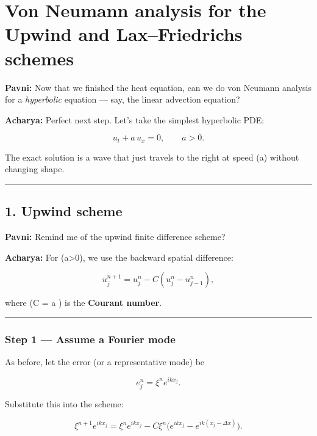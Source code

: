 \documentclass[
  letterpaper,
]{book}
\begin{document}

\chapter{Von Neumann analysis for the Upwind and Lax--Friedrichs
schemes}\label{von-neumann-analysis-for-the-upwind-and-laxfriedrichs-schemes}

\textbf{Pavni:} Now that we finished the heat equation, can we do von
Neumann analysis for a \emph{hyperbolic} equation --- say, the linear
advection equation?

\textbf{Acharya:} Perfect next step. Let's take the simplest hyperbolic
PDE:

\[
u_t + a\,u_x = 0, \qquad a>0.
\]

The exact solution is a wave that just travels to the right at speed (a)
without changing shape.

\begin{center}\rule{0.5\linewidth}{0.5pt}\end{center}

\section{1. Upwind scheme}\label{upwind-scheme}

\textbf{Pavni:} Remind me of the upwind finite difference scheme?

\textbf{Acharya:} For (a\textgreater0), we use the backward spatial
difference:

\[
u_j^{n+1} = u_j^n - C (u_j^n - u_{j-1}^n),
\]

where (C = a ) is the \textbf{Courant number}.

\begin{center}\rule{0.5\linewidth}{0.5pt}\end{center}

\subsection{Step 1 --- Assume a Fourier
mode}\label{step-1-assume-a-fourier-mode}

As before, let the error (or a representative mode) be

\[
e_j^n = \xi^n e^{i k x_j}.
\]

Substitute this into the scheme:

\[
\xi^{n+1} e^{i k x_j}
= \xi^n e^{i k x_j} - C \xi^n \big(e^{i k x_j} - e^{i k (x_j - \Delta x)}\big).
\]
\end{document}
